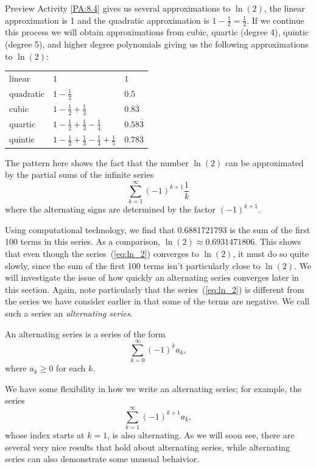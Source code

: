 Preview Activity \ref{PA:8.4} gives us several approximations to $\ln(2)$, the linear approximation is 1 and the quadratic approximation is $1 - \frac{1}{2} = \frac{1}{2}$. If we continue this process we will obtain approximations from cubic, quartic (degree 4), quintic (degree 5), and higher degree polynomials giving us the following approximations to $\ln(2)$:
\begin{center}
\begin{tabular}{lll} %
linear  &$1$            &$1$ \vspace{0.02in} \\  %
quadratic &$1 - \frac{1}{2}$    &$0.5$ \vspace{0.02in}\\ %
cubic &$1 - \frac{1}{2} + \frac{1}{3}$  &$0.8\overline{3}$  \vspace{0.02in}\\ %
quartic  &$1 - \frac{1}{2} + \frac{1}{3} - \frac{1}{4}$ &$0.58\overline{3}$ \vspace{0.02in} \\ %
quintic  &$1 - \frac{1}{2} + \frac{1}{3} - \frac{1}{4} + \frac{1}{5}$   &$0.78\overline{3}$ \vspace{0.02in} \\ %
\end{tabular}
\end{center}
The pattern here shows the fact that the number $\ln(2)$ can be approximated by the partial sums of the infinite series
\begin{equation} \label{eq:ln_2}
\sum_{k=1}^{\infty} (-1)^{k+1} \frac{1}{k}
\end{equation}
where the alternating signs are determined by the factor $(-1)^{k+1}$. 

Using computational technology, we find that 0.6881721793 is the sum of the first 100 terms in this series. As a comparison, $\ln(2) \approx 0.6931471806$. This shows that even though the series~(\ref{eq:ln_2}) converges to $\ln(2)$, it must do so quite slowly, since the sum of the first 100 terms isn't particularly close to $\ln(2)$. We will investigate the issue of how quickly an alternating series converges later in this section.  Again, note particularly that the series~(\ref{eq:ln_2}) is different from the series we have consider earlier in that some of the terms are negative. We call such a series an \emph{alternating series}.

\begin{definition} An alternating series is a series of the form
\[\sum_{k=0}^{\infty} (-1)^k a_k,\]
where $a_k \geq 0$ for each $k$.
\end{definition}
We have some flexibility in how we write an alternating series; for example, the series
\[\sum_{k=1}^{\infty} (-1)^{k+1} a_k,\]
whose index starts at $k = 1$, is also alternating.  As we will soon see, there are several very nice results that hold about alternating series, while alternating series can also demonstrate some unusual behaivior.

